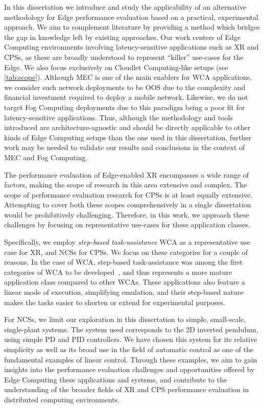 In this dissertation we introduce and study the applicability of an alternative methodology for Edge performance evaluation based on a practical, experimental approach.
We aim to complement literature by providing a method which bridges the gap in knowledge left by existing approaches.
Our work centers of Edge Computing environments involving latency-sensitive applications such as \gls{XR} and \glspl{CPS}, as these are broadly understood to represent ``killer'' use-cases for the Edge.
We also focus exclusively on Cloudlet Computing-like setups (see \cref{tab:scope}).
Although \gls{MEC} is one of the main enablers for \gls{WCA} applications, we consider such network deployments to be \gls{OOS} due to the complexity and financial investment required to deploy a mobile network.
Likewise, we do not target Fog Computing deployments due to this paradigm being a poor fit for latency-sensitive applications.
Thus, although the methodology and tools introduced are architecture-agnostic and should be directly applicable to other kinds of Edge Computing setups than the one used in this dissertation, further work may be needed to validate our results and conclusions in the context of \gls{MEC} and Fog Computing.

The performance evaluation of Edge-enabled \gls{XR} encompasses a wide range of factors, making the scope of research in this area extensive and complex.
The scope of performance evaluation research for \glspl{CPS} is at least equally extensive.
Attempting to cover both these scopes comprehensively in a single dissertation would be prohibitively challenging.
Therefore, in this work, we approach these challenges by focusing on representative use-cases for these application classes.

Specifically, we employ \emph{step-based task-assistance} \gls{WCA} as a representative use case for \gls{XR}, and \glspl{NCS} for \glspl{CPS}.
We focus on these categories for a couple of reasons.
In the case of \gls{WCA}, step-based task-assistance was among the first categories of \gls{WCA} to be developed~\cite{chen2015early}, and thus represents a more mature application class compared to other \glspl{WCA}.
These applications also feature a linear mode of execution, simplifying emulation, and their step-based nature makes the tasks easier to shorten or extend for experimental purposes.

For \glspl{NCS}, we limit our exploration in this dissertation to simple, small-scale, single-plant systems.
The system used corresponds to the \gls{2D} inverted pendulum, using simple \gls{PD} and \gls{PID} controllers.
We have chosen this system for its relative simplicity as well as its broad use in the field of automatic control as one of the fundamental examples of linear control.
Through these examples, we aim to gain insights into the performance evaluation challenges and opportunities offered by Edge Computing these applications and systems, and contribute to the understanding of the broader fields of \gls{XR} and \gls{CPS} performance evaluation in distributed computing environments.

